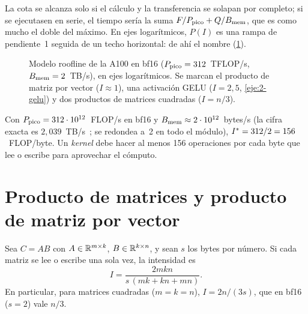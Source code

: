 La cota se alcanza solo si el cálculo y la transferencia se solapan por completo; si se ejecutasen en serie, el tiempo sería la suma $F/P_{\mathrm{pico}}+Q/B_{\mathrm{mem}}$, que es como mucho el doble del máximo. En ejes logarítmicos, $P(I)$ es una rampa de pendiente~1 seguida de un techo horizontal: de ahí el nombre (\cref{fig:roofline}).

\begin{figure}[h]
\centering
{}
\caption{Modelo roofline de la A100 en bf16 ($P_{\mathrm{pico}}=312$~TFLOP/s, $B_{\mathrm{mem}}=2$~TB/s), en ejes logarítmicos. Se marcan el producto de matriz por vector ($I\approx 1$), una activación GELU ($I=2{,}5$, \cref{eje:2-gelu}) y dos productos de matrices cuadradas ($I=n/3$).}
\label{fig:roofline}
\end{figure}

\begin{ejemplo}\label{ej:icrit}
Con $P_{\mathrm{pico}}=312\cdot 10^{12}$~FLOP/s en bf16 y $B_{\mathrm{mem}}\approx 2\cdot 10^{12}$~bytes/s (la cifra exacta es $2{,}039$~TB/s~\cite{a100}; se redondea a~2 en todo el módulo), $I^{\ast}=312/2=156$~FLOP/byte. Un \emph{kernel} debe hacer al menos 156 operaciones por cada byte que lee o escribe para aprovechar el cómputo.
\end{ejemplo}

\section{Producto de matrices y producto de matriz por vector}

\begin{proposicion}\label{prop:intensidad-matmul}
Sea $C=AB$ con $A\in\mathbb{R}^{m\times k}$, $B\in\mathbb{R}^{k\times n}$, y sean $s$ los bytes por número. Si cada matriz se lee o escribe una sola vez, la intensidad es
\[
I=\frac{2mkn}{s\,(mk+kn+mn)}.
\]
En particular, para matrices cuadradas ($m=k=n$), $I=2n/(3s)$, que en bf16 ($s=2$) vale $n/3$.
\end{proposicion}


